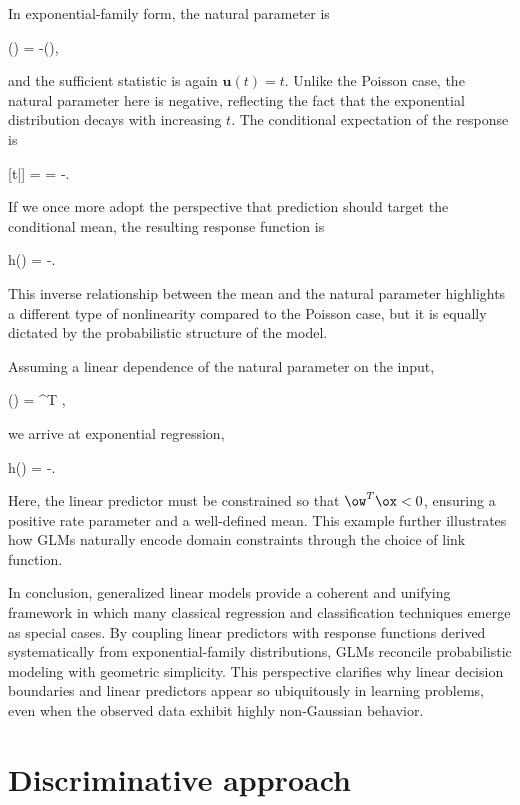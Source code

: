 In exponential-family form, the natural parameter is
\begin{myequation}
\theta(\x) = -\lambda(\x),
\end{myequation}
and the sufficient statistic is again $\mathbf{u}(t) = t$. Unlike the Poisson case, the natural parameter here is negative, reflecting the fact that the exponential distribution decays with increasing $t$. The conditional expectation of the response is
\begin{myequation}
[t|\x] =  = -.
\end{myequation}
If we once more adopt the perspective that prediction should target the conditional mean, the resulting response function is
\begin{myequation}
h(\x) = -.
\end{myequation}
This inverse relationship between the mean and the natural parameter highlights a different type of nonlinearity compared to the Poisson case, but it is equally dictated by the probabilistic structure of the model.

Assuming a linear dependence of the natural parameter on the input,
\begin{myequation}
\theta(\x) = \ow^{T} \ox,
\end{myequation}
we arrive at exponential regression,
\begin{myequation}
h(\x) = -.
\end{myequation}
Here, the linear predictor must be constrained so that $\ow^{T} \ox < 0$, ensuring a positive rate parameter and a well-defined mean. This example further illustrates how GLMs naturally encode domain constraints through the choice of link function.

\medskip
In conclusion, generalized linear models provide a coherent and unifying framework in which many classical regression and classification techniques emerge as special cases. By coupling linear predictors with response functions derived systematically from exponential-family distributions, GLMs reconcile probabilistic modeling with geometric simplicity. This perspective clarifies why linear decision boundaries and linear predictors appear so ubiquitously in learning problems, even when the observed data exhibit highly non-Gaussian behavior.



%
%
\section*{Discriminative approach}

